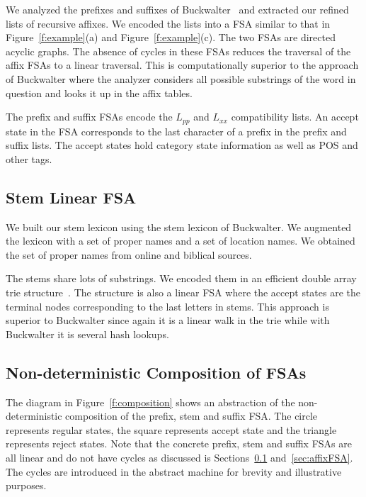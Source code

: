 \documentclass[11pt,letterpaper]{article}
\begin{document}
We analyzed the prefixes and suffixes of 
Buckwalter~\cite{Buckwalter:02}
and extracted our refined lists of recursive affixes.
We encoded the lists into a FSA similar to that
in Figure~\ref{f:example}(a) and Figure~\ref{f:example}(c).
The two FSAs are directed acyclic graphs. 
The absence of cycles in these FSAs reduces the 
traversal of the affix FSAs to a linear traversal.
This is computationally superior to the 
approach of Buckwalter where the analyzer considers
all possible substrings of the word in question
and looks it up in the affix tables. 

The prefix and suffix FSAs encode the $L_{pp}$ and
$L_{xx}$ compatibility lists.
An accept state in the FSA corresponds to the last character
of a prefix in the prefix and suffix lists.
The accept states hold category state information as well
as POS and other tags.

\subsection{Stem Linear FSA}
\label{sec:stemFSA}

We built our stem lexicon using the stem lexicon of 
Buckwalter. 
We augmented the lexicon with a set of proper names and
a set of location names. 
We obtained the set of proper names from online 
and biblical sources. 

The stems share lots of substrings. We encoded them in
an efficient double array trie structure~\cite{Aoe:89}. 
The structure is also a linear FSA where the accept
states are the terminal nodes corresponding to the last 
letters in stems. 
This approach is superior to Buckwalter since again it is
a linear walk in the trie while with Buckwalter it is 
several hash lookups.

\subsection{Non-deterministic Composition of FSAs}
\label{sec:ndfsa}

The diagram in Figure~\ref{f:composition} shows an 
abstraction of the non-deterministic composition 
of the prefix, stem and suffix FSA. 
The circle represents regular states, the square
represents accept state and the triangle represents
reject states. 
Note that the concrete prefix, stem and suffix FSAs
are all linear and do not have cycles as discussed 
is Sections~\ref{sec:stemFSA} and~\ref{sec:affixFSA}.
The cycles are introduced in the abstract machine
for brevity and illustrative purposes.
\end{document}
